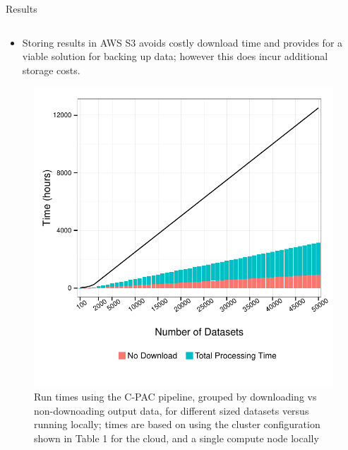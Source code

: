 \documentclass[final,hyperref={pdfpagelabels=false}]{beamer}
\begin{document}
\begin{frame}
\begin{columns}
\begin{column}{.5\textwidth}
{\begin{block}{Results}
\begin{column}{.47\textwidth}
\begin{itemize}
                  \item Storing results in AWS S3 avoids costly download time and provides for a viable solution for backing up data; however this does incur additional storage costs.
              \end{itemize}
              \begin{figure}
                  \includegraphics[width=.99\textwidth]{cpac-times.pdf}
                  \caption{\label{fig:cpac-times}Run times using the C-PAC pipeline, grouped by downloading vs non-downoading output data, for different sized datasets versus running locally; times are based on using the cluster configuration shown in Table 1 for the cloud, and a single compute node locally}
              \end{figure}
              \begin{figure}

\end{figure}
\end{column}
\end{block}}
\end{column}
\end{columns}
\end{frame}
\end{document}
